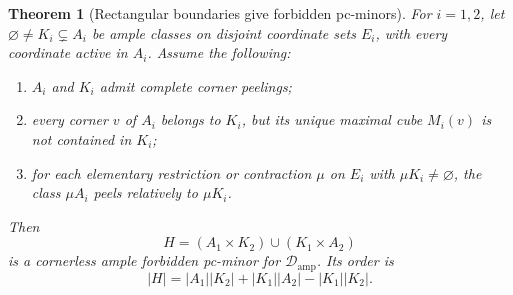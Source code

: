 \documentclass[11pt]{article}
\numberwithin{equation}{section}
\newtheorem{theorem}{Theorem}[section]
\theoremstyle{definition}
\theoremstyle{remark}
\newcommand{\Damp}{\mathcal D_{\mathrm{amp}}}
\begin{document}
\begin{theorem}[Rectangular boundaries give forbidden pc-minors]
\label{thm:rectangular-boundary-forbidden}
For $i=1,2$, let $\varnothing\ne K_i\subsetneq A_i$ be ample
classes on disjoint coordinate sets $E_i$, with every coordinate active
in $A_i$. Assume the following:
\begin{enumerate}
 \item $A_i$ and $K_i$ admit complete corner peelings;
 \item every corner $v$ of $A_i$ belongs to $K_i$, but its unique
       maximal cube $M_i(v)$ is not contained in $K_i$;
 \item for each elementary restriction or contraction $\mu$ on $E_i$
       with $\mu K_i\ne\varnothing$, the class $\mu A_i$ peels
       relatively to $\mu K_i$.
\end{enumerate}
Then
\[
 H=(A_1\times K_2)\cup(K_1\times A_2)
\]
is a cornerless ample forbidden pc-minor for $\Damp$. Its order is
\[
 |H|=|A_1||K_2|+|K_1||A_2|-|K_1||K_2|.
\]
\end{theorem}
\end{document}

